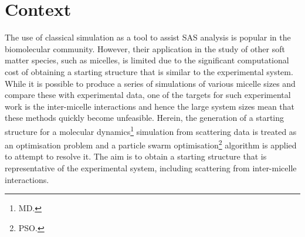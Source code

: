 \section*{Context}
The use of classical simulation as a tool to assist SAS analysis is popular in the biomolecular community.\autocite{perkins_atomistic_2016,hub_interpreting_2018}
However, their application in the study of other soft matter species, such as micelles, is limited due to the significant computational cost of obtaining a starting structure that is similar to the experimental system.
While it is possible to produce a series of simulations of various micelle sizes and compare these with experimental data, one of the targets for such experimental work is the inter-micelle interactions and hence the large system sizes mean that these methods quickly become unfeasible.
Herein, the generation of a starting structure for a molecular dynamics\footnote{MD.} simulation from scattering data is treated as an optimisation problem and a particle swarm optimisation\footnote{PSO.} algorithm is applied to attempt to resolve it.
The aim is to obtain a starting structure that is representative of the experimental system, including scattering from inter-micelle interactions.
